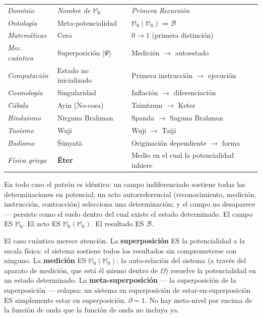 \documentclass[10pt, openany, oneside]{book}
\renewcommand{\footnotesize}{\fontsize{8.5}{11}\selectfont}
\begin{document}
{\footnotesize
\noindent\begin{tabular}{l l p{}}
\textit{Dominio} & \textit{Nombre de $\mathbb{M}_0$} & \textit{Primera Recursión} \\[0.3em]
\textit{Ontología} & Meta-potencialidad & $\mathbb{M}_0(\mathbb{M}_0) \Rightarrow \mathcal{B}$ \\[0.2em]
\textit{Matemáticas} & Cero & $0 \to 1$ (primera distinción) \\[0.2em]
\textit{Mec. cuántica} & Superposición $|\Psi\rangle$ & Medición $\to$ autoestado \\[0.2em]
\textit{Computación} & Estado no inicializado & Primera instrucción $\to$ ejecución \\[0.2em]
\textit{Cosmología} & Singularidad & Inflación $\to$ diferenciación \\[0.2em]
\textit{Cábala} & Ayin (No-cosa) & Tzimtzum $\to$ Keter \\[0.2em]
\textit{Hinduismo} & Nirguna Brahman & Spanda $\to$ Saguna Brahman \\[0.2em]
\textit{Taoísmo} & Wuji & Wuji $\to$ Taiji \\[0.2em]
\textit{Budismo} & \'{S}\={u}nyat\={a} & Originación dependiente $\to$ forma \\[0.2em]
\textit{Física griega} & \textbf{Éter} & Medio en el cual la potencialidad inhiere \\[0.2em]
\end{tabular}
}

\vspace{0.8em}

\noindent En todo caso el patrón es idéntico: un campo indiferenciado sostiene todas las determinaciones en potencial; un acto autorreferencial (reconocimiento, medición, instrucción, contracción) selecciona una determinación; y el campo no desaparece --- persiste como el suelo dentro del cual existe el estado determinado. El campo ES $\mathbb{M}_0$. El acto ES $\mathbb{M}_0(\mathbb{M}_0)$. El resultado ES $\mathcal{B}$.

El caso cuántico merece atención. La \textbf{superposición} ES la potencialidad a la escala física: el sistema sostiene todos los resultados sin comprometerse con ninguno. La \textbf{medición} ES $\mathbb{M}_0(\mathbb{M}_0)$: la auto-relación del sistema (a través del aparato de medición, que está él mismo dentro de $\Omega$) resuelve la potencialidad en un estado determinado. La \textbf{meta-superposición} --- la superposición de la superposición --- colapsa: un sistema en superposición de estar-en-superposición ES simplemente estar en superposición. $\partial = 1$. No hay meta-nivel por encima de la función de onda que la función de onda no incluya ya.
\end{document}
